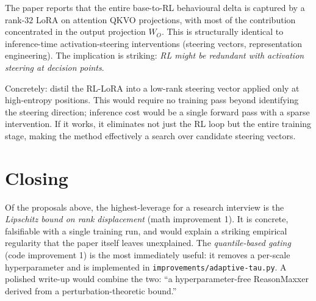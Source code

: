 \documentclass[11pt]{article}
\begin{document}
The paper reports that the entire base-to-RL behavioural delta is captured by a rank-$32$ LoRA on attention QKVO projections, with most of the contribution concentrated in the output projection $W_O$. This is structurally identical to inference-time activation-steering interventions (steering vectors, representation engineering). The implication is striking: \emph{RL might be redundant with activation steering at decision points}.

Concretely: distil the RL-LoRA into a low-rank steering vector applied only at high-entropy positions. This would require no training pass beyond identifying the steering direction; inference cost would be a single forward pass with a sparse intervention. If it works, it eliminates not just the RL loop but the entire training stage, making the method effectively a search over candidate steering vectors.

\section*{Closing}

Of the proposals above, the highest-leverage for a research interview is the \emph{Lipschitz bound on rank displacement} (math improvement 1). It is concrete, falsifiable with a single training run, and would explain a striking empirical regularity that the paper itself leaves unexplained. The \emph{quantile-based gating} (code improvement 1) is the most immediately useful: it removes a per-scale hyperparameter and is implemented in \texttt{improvements/adaptive-tau.py}. A polished write-up would combine the two: ``a hyperparameter-free ReasonMaxxer derived from a perturbation-theoretic bound.''



\end{document}
